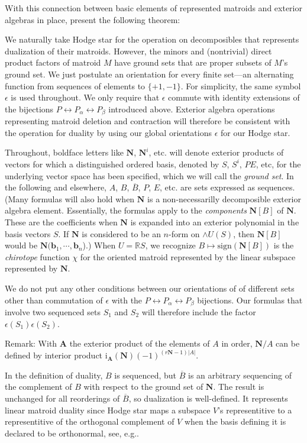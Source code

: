\documentclass[Unicode]{cedram-alco}
\newcommand{\ext}[1]{\ensuremath{\mathbf{#1}}}
\begin{document}
  
With this connection between basic elements of represented matroids
and exterior algebras in place, present the following theorem:


We naturally take Hodge star for the operation on
decomposibles that represents dualization of their
matroids.
However, the minors and
(nontrivial) direct product factors of matroid $M$
have ground sets that are proper subsets of $M$'s ground set.
We just postulate an orientation for every finite set---an alternating
function
from sequences of elements to $\{+1,-1\}$.
For simplicity, the same symbol $\epsilon$ is used throughout.
We only require that $\epsilon$ commute with identity
extensions of the bijections 
$P \leftrightarrow P_{\alpha}\leftrightarrow P_{\beta}$
introduced above.
Exterior algebra operations
representing matroid deletion and contraction will therefore
be consistent with the operation for duality by using our
global orientations $\epsilon$ for our Hodge star.

Throughout, boldface letters like $\ext{N}$, $\ext{N}^{i}$, etc. will denote
exterior products of vectors for which a distinguished ordered
basis, denoted by $S$, $S^{i}$, $PE$, etc,
for the underlying vector space has been specified, which we will
call the \emph{ground set}.
In the following
and elsewhere, $A$, $B$, $\overline{B}$, $P$, $E$, etc. are sets
expressed as sequences.
(Many formulas will also
hold when $\ext{N}$ is a non-necessarilly decomposible exterior algebra element.
Essentially, the formulas apply to the \emph{components} $\ext{N}[B]$ of $\ext{N}$.  These
are the coefficients when $\ext{N}$ is expanded into an exterior polynomial
in the basis vectors $S$.  If $\ext{N}$ is considered to be an $n$-form on $\wedge U(S)$,
then $\ext{N}[B]$ would be $\ext{N}(\ext{b}_1, \cdots, \ext{b}_n$).)
When $U=\mathbb{R}S$, we recognize $B\mapsto\text{sign}(\ext{N}[B])$
is the \emph{chirotope} function $\chi$ for the oriented matroid represented by the
linear subspace represented by $\ext{N}$.

We do not put any other conditions between our orientations of
of different sets other than commutation of $\epsilon$ with the
$P \leftrightarrow P_{\alpha}\leftrightarrow P_{\beta}$ bijections.
Our formulas that involve two sequenced sets $S_1$
and $S_2$ will therefore include the factor $\epsilon(S_1)\epsilon(S_2)$.

Remark: With $\ext{A}$ the exterior product of the elements of $A$ in order, $\ext{N}/A$
can be defined by interior product\cite{MarcusFDMuAlPt2}
$\text{i}_{\ext{A}}(\ext{N})(-1)^{(r\ext{N}-1)|A|}$.


    In the definition of duality, $B$ is sequenced,
    but $\overline{B}$ is an arbitrary sequencing of the complement of $B$
    with respect to the ground set of $\ext{N}$.
    The result is unchanged for all reorderings of $\overline{B}$,
    so dualization is well-defined.  It represents linear matroid duality
    since Hodge star maps a subspace $V$'s representitive to a representitive
    of the orthogonal complement of $V$ when the basis defining it is
    declared to be orthonormal, see, e.g.\cite{MarcusFDMuAlPt2}.





\end{document}
